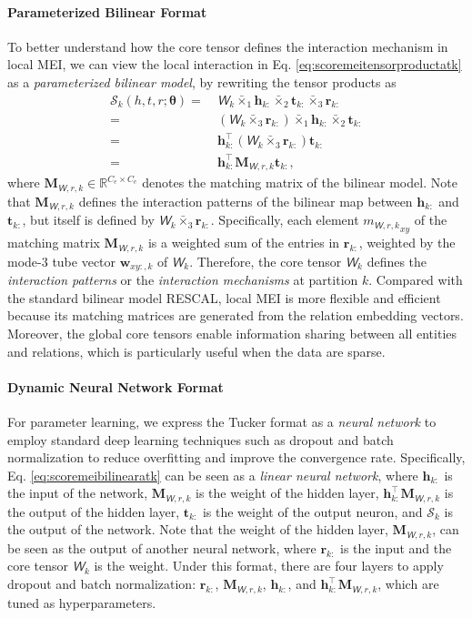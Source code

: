 \documentclass{ecai}
\def\vh{{\bm{h}}}
\def\vr{{\bm{r}}}
\def\vt{{\bm{t}}}
\def\vw{{\bm{w}}}
\def\mM{{\bm{M}}}
\newcommand{\tens}[1]{\bm{\mathsfit{#1}}}
\def\tW{{\tens{W}}}
\def\gS{{\mathcal{S}}}
\def\sR{{\mathbb{R}}}
\theoremstyle{plain}  \newtheorem{thm}{Theorem}  \newtheorem{lem}[thm]{Lemma}  \newtheorem{prop}[thm]{Proposition}
\theoremstyle{remark}  \newtheorem*{rem}{Remark}
\begin{document}
\paragraph{Parameterized Bilinear Format}
To better understand how the core tensor defines the interaction mechanism in local MEI, we can view the local interaction in Eq. \ref{eq:scoremeitensorproductatk} as a \textit{parameterized bilinear model}, by rewriting the tensor products as 
\begin{align}
\gS_k (h,t,r;\bm{\theta}) =\ &\tW_k \bar{\times}_1 \vh_{k:} \bar{\times}_2 \vt_{k:} \bar{\times}_3 \vr_{k:} \nonumber\\
=\ &(\tW_k \bar{\times}_3 \vr_{k:}) \bar{\times}_1 \vh_{k:} \bar{\times}_2 \vt_{k:}\\
=\ &\vh_{k:}^\top (\tW_k \bar{\times}_3 \vr_{k:}) \vt_{k:}\\
=\ &\vh_{k:}^\top \mM_{\tW, r, k} \vt_{k:}, \label{eq:scoremeibilinearatk}
\end{align}
where $ \mM_{\tW, r, k} \in \sR^{C_e \times C_e} $ denotes the matching matrix of the bilinear model. Note that $ \mM_{\tW, r, k} $ defines the interaction patterns of the bilinear map between $ \vh_{k:} $ and $ \vt_{k:} $, but itself is defined by $ \tW_k \bar{\times}_3 \vr_{k:} $. Specifically, each element $ {m_{\tW, r, k}}_{xy} $ of the matching matrix $ \mM_{\tW, r, k} $ is a weighted sum of the entries in $ \vr_{k:} $, weighted by the mode-$ 3 $ tube vector $ \vw_{xy:, k} $ of $ \tW_k $. Therefore, the core tensor $ \tW_k $ defines the \textit{interaction patterns} or the \textit{interaction mechanisms} at partition $ k $. Compared with the standard bilinear model RESCAL, local MEI is more flexible and efficient because its matching matrices are generated from the relation embedding vectors. Moreover, the global core tensors enable information sharing between all entities and relations, which is particularly useful when the data are sparse.



\paragraph{Dynamic Neural Network Format}
For parameter learning, we express the Tucker format as a \textit{neural network} to employ standard deep learning techniques such as dropout \cite{srivastava_dropoutsimpleway_2014} and batch normalization \cite{ioffe_batchnormalizationaccelerating_2015} to reduce overfitting and improve the convergence rate. Specifically, Eq. \ref{eq:scoremeibilinearatk} can be seen as a \textit{linear neural network}, where $ \vh_{k:} $ is the input of the network, $ \mM_{\tW, r, k} $ is the weight of the hidden layer, $ \vh_{k:}^\top \mM_{\tW, r, k} $ is the output of the hidden layer, $ \vt_{k:} $ is the weight of the output neuron, and $ \gS_k $ is the output of the network. Note that the weight of the hidden layer, $ \mM_{\tW, r, k} $, can be seen as the output of another neural network, where $ \vr_{k:} $ is the input and the core tensor $ \tW_k $ is the weight. Under this format, there are four layers to apply dropout and batch normalization: $ \vr_{k:} $, $ \mM_{\tW, r, k} $, $ \vh_{k:} $, and $ \vh_{k:}^\top \mM_{\tW, r, k} $, which are tuned as hyperparameters.
\end{document}
